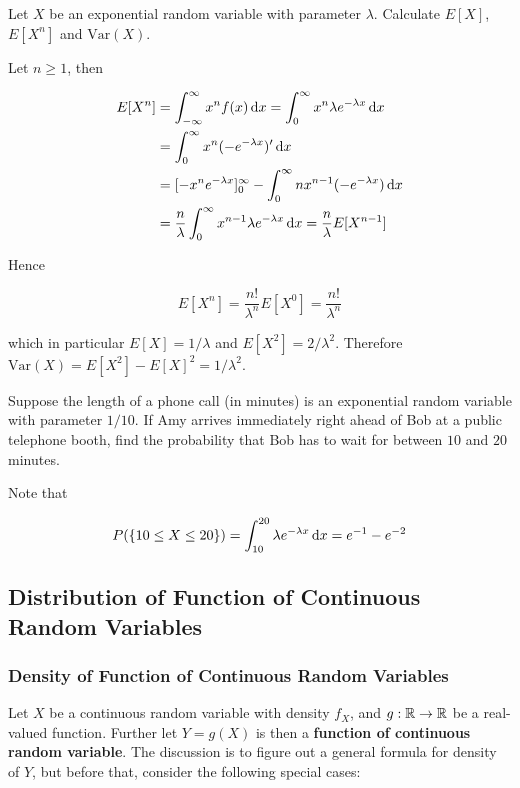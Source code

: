 \documentclass[a4paper,12pt]{article}
\begin{document}
\begin{exm}
  Let $X$ be an exponential random variable with parameter $\lambda$. Calculate $E[X]$, $E[X^{n}]$ and $\mathrm{Var}(X)$.\n
  
  \ans Let $n\geq 1$, then

  $$\begin{aligned}[t]
    E[X^{n}]&=\int_{-\infty}^{\infty}x^{n}f(x)\,\mathrm{d} x=\int_{0}^{\infty}x^{n}\lambda e^{-\lambda x}\,\mathrm{d} x\\
    &=\int_{0}^{\infty}x^{n}(-e^{-\lambda x})'\,\mathrm{d} x\\
    &=[-x^{n}e^{-\lambda x}]_{0}^{\infty}-\int_{0}^{\infty}nx^{n-1}(-e^{-\lambda x})\,\mathrm{d} x\\
    &=\frac{n}{\lambda}\int_{0}^{\infty}x^{n-1}\lambda e^{-\lambda x}\,\mathrm{d} x=\frac{n}{\lambda}E[X^{n-1}]
  \end{aligned}$$\s

  Hence

  $$E[X^{n}]=\frac{n!}{\lambda^{n}}E[X^{0}]=\frac{n!}{\lambda^{n}}$$\s

  which in particular $E[X]=1/\lambda$ and $E[X^{2}]=2/\lambda^{2}$. Therefore $\mathrm{Var}(X)=E[X^{2}]-E[X]^{2}=1/\lambda^{2}$.
\end{exm}\n

\begin{exm}
  Suppose the length of a phone call (in minutes) is an exponential random variable with parameter $1/10$. If Amy arrives immediately right ahead of Bob at a public telephone booth, find the probability that Bob has to wait for between $10$ and $20$ minutes.\n

  \ans Note that

  $$P(\left\{ 10\leq X\leq 20\right\})=\int_{10}^{20}\lambda e^{-\lambda x}\,\mathrm{d} x=e^{-1}-e^{-2}$$
\end{exm}

\subsection{Distribution of Function of Continuous Random Variables}
\subsubsection{Density of Function of Continuous Random Variables}
Let $X$ be a continuous random variable with density $f_{X}$, and $g:\mathbb{R}\to\mathbb{R}$ be a real-valued function. Further let $Y=g(X)$ is then a \textbf{function of continuous random variable}. The discussion is to figure out a general formula for density of $Y$, but before that, consider the following special cases:\n
\end{document}
